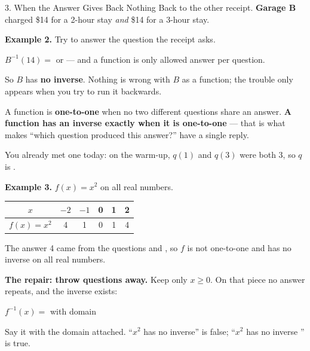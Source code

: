 \documentclass[10pt]{article}
\begin{document}
\boxguard[26]
\begin{notesbox}{3. When the Answer Gives Back Nothing}
Back to the other receipt. \textbf{Garage B} charged \$14 for a 2-hour stay
\textit{and} \$14 for a 3-hour stay.

\smallskip
\textbf{Example 2.} Try to answer the question the receipt asks.

\smallskip
$B^{-1}(14) = $ \blank{1.4cm} \; or \; \blank{1.4cm} --- and a function is
only allowed \blank{2.4cm} answer per question.

\smallskip
So $B$ has \textbf{no inverse}. Nothing is wrong with $B$ as a function; the
trouble only appears when you try to run it backwards.

\medskip
\begin{center}
\begin{tcolorbox}[colback=lilac, colframe=plum, boxrule=0.8pt, arc=2mm,
    left=3mm, right=3mm, top=2mm, bottom=2mm, width=0.94\linewidth]
A function is \textbf{one-to-one} when no two different questions share an
answer. \textbf{A function has an inverse exactly when it is one-to-one} ---
that is what makes ``which question produced this answer?'' have a single
reply.
\end{tcolorbox}
\end{center}

\smallskip
You already met one today: on the warm-up, $q(1)$ and $q(3)$ were both 3, so
$q$ is \blank{3cm}.

\medskip
\textbf{Example 3.} $f(x) = x^2$ on all real numbers.

\smallskip
\renewcommand{\arraystretch}{1.4}
\begin{center}
\begin{tabular}{|c|c|c|c|c|c|}
\hline
$x$ & $-2$ & $-1$ & 0 & 1 & 2 \\
\hline
$f(x) = x^2$ & 4 & 1 & 0 & 1 & 4 \\
\hline
\end{tabular}
\end{center}

\smallskip
The answer 4 came from the questions \blank{1.2cm} and \blank{1.2cm}, so $f$ is
not one-to-one and has no inverse on all real numbers.

\medskip
\textbf{The repair: throw questions away.} Keep only $x \ge 0$. On that piece
no answer repeats, and the inverse exists:

\begin{center}
$f^{-1}(x) = $ \blank{2.4cm} \qquad with domain \blank{2.4cm}
\end{center}

\smallskip
Say it with the domain attached. ``$x^2$ has no inverse'' is false;
``$x^2$ has no inverse \blank{4cm}'' is true.
\end{notesbox}
\end{document}
